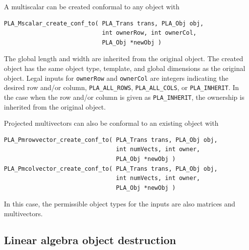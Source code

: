 A multiscalar can be created conformal to any object with
\begin{FlaSpec}
\begin{verbatim}
PLA_Mscalar_create_conf_to( PLA_Trans trans, PLA_Obj obj, 
                            int ownerRow, int ownerCol,
                            PLA_Obj *newObj )
\end{verbatim}
\end{FlaSpec}
The global length and width are inherited from the original object.
The created object has the same object type, template, and global
dimensions as the original object.
Legal inputs for {\tt ownerRow} and {\tt ownerCol} are
integers indicating the desired row and/or column,
{\tt PLA\_ALL\_ROWS}, {\tt PLA\_ALL\_COLS}, or {\tt PLA\_INHERIT}.
In the case when the row and/or column is given as {\tt PLA\_INHERIT}, 
the ownership is inherited from the original object.

Projected multivectors can also be conformal to an existing object with
\begin{FlaSpec}
\begin{verbatim}
PLA_Pmrowvector_create_conf_to( PLA_Trans trans, PLA_Obj obj, 
                                int numVects, int owner, 
                                PLA_Obj *newObj )
PLA_Pmcolvector_create_conf_to( PLA_Trans trans, PLA_Obj obj, 
                                int numVects, int owner, 
                                PLA_Obj *newObj )
\end{verbatim}
\end{FlaSpec}
In this case, the permissible object types for the
inputs are also matrices and multivectors.


\subsection{Linear algebra object destruction}

